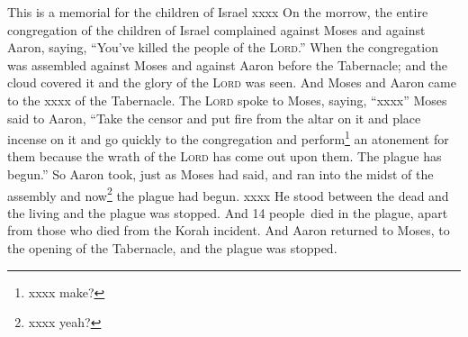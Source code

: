 \begin{inparaenum}
     This is a memorial for the children of Israel xxxx%
     On the morrow, the entire congregation of the children of Israel complained against Moses and against Aaron, saying, ``You've killed the people of the \textsc{Lord}.''%
     When the congregation was assembled against Moses and against Aaron before the Tabernacle; and the cloud covered it and the glory of the \textsc{Lord} was seen.%
     And Moses and Aaron came to the xxxx of the Tabernacle.%
     The \textsc{Lord} spoke to Moses, saying,%
     ``xxxx''%
     Moses said to Aaron, ``Take the censor and put fire from the altar on it and place incense on it and go quickly to the congregation and perform\footnote{xxxx make?} an atonement for them because the wrath of the \textsc{Lord} has come out upon them. The plague has begun.''%
     So Aaron took, just as Moses had said, and ran into the midst of the assembly and now\footnote{xxxx yeah?} the plague had begun. xxxx%
     He stood between the dead and the living and the plague was stopped.%
     And 14 people\understood\ died in the plague, apart from those who died from the Korah incident.%
     And Aaron returned to Moses, to the opening of the Tabernacle, and the plague was stopped.%
\end{inparaenum}
